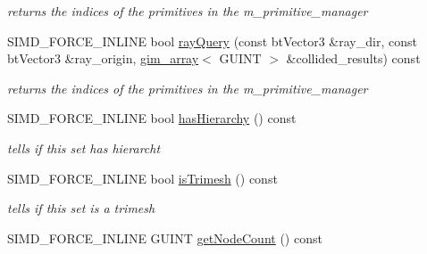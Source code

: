 \begin{Indent}{\bf }
\begin{CompactItemize}
\begin{CompactList}\small\item\em returns the indices of the primitives in the m\_\-primitive\_\-manager \item\end{CompactList}\item 
\hypertarget{class_g_i_m___b_o_x___t_r_e_e___t_e_m_p_l_a_t_e___s_e_t_41bdfb53e019a173fbfb157029db11b4}{
SIMD\_\-FORCE\_\-INLINE bool \hyperlink{class_g_i_m___b_o_x___t_r_e_e___t_e_m_p_l_a_t_e___s_e_t_41bdfb53e019a173fbfb157029db11b4}{rayQuery} (const btVector3 \&ray\_\-dir, const btVector3 \&ray\_\-origin, \hyperlink{classgim__array}{gim\_\-array}$<$ GUINT $>$ \&collided\_\-results) const }
\label{class_g_i_m___b_o_x___t_r_e_e___t_e_m_p_l_a_t_e___s_e_t_41bdfb53e019a173fbfb157029db11b4}

\begin{CompactList}\small\item\em returns the indices of the primitives in the m\_\-primitive\_\-manager \item\end{CompactList}\item 
\hypertarget{class_g_i_m___b_o_x___t_r_e_e___t_e_m_p_l_a_t_e___s_e_t_4582ba1e2cee36d653aae235de9e2562}{
SIMD\_\-FORCE\_\-INLINE bool \hyperlink{class_g_i_m___b_o_x___t_r_e_e___t_e_m_p_l_a_t_e___s_e_t_4582ba1e2cee36d653aae235de9e2562}{hasHierarchy} () const }
\label{class_g_i_m___b_o_x___t_r_e_e___t_e_m_p_l_a_t_e___s_e_t_4582ba1e2cee36d653aae235de9e2562}

\begin{CompactList}\small\item\em tells if this set has hierarcht \item\end{CompactList}\item 
\hypertarget{class_g_i_m___b_o_x___t_r_e_e___t_e_m_p_l_a_t_e___s_e_t_db73fde6e00a979c38b2240b7b706a8d}{
SIMD\_\-FORCE\_\-INLINE bool \hyperlink{class_g_i_m___b_o_x___t_r_e_e___t_e_m_p_l_a_t_e___s_e_t_db73fde6e00a979c38b2240b7b706a8d}{isTrimesh} () const }
\label{class_g_i_m___b_o_x___t_r_e_e___t_e_m_p_l_a_t_e___s_e_t_db73fde6e00a979c38b2240b7b706a8d}

\begin{CompactList}\small\item\em tells if this set is a trimesh \item\end{CompactList}\item 
\hypertarget{class_g_i_m___b_o_x___t_r_e_e___t_e_m_p_l_a_t_e___s_e_t_d46fb05b667c4f79c9d599dfb04d5566}{
SIMD\_\-FORCE\_\-INLINE GUINT \hyperlink{class_g_i_m___b_o_x___t_r_e_e___t_e_m_p_l_a_t_e___s_e_t_d46fb05b667c4f79c9d599dfb04d5566}{getNodeCount} () const }
\label{class_g_i_m___b_o_x___t_r_e_e___t_e_m_p_l_a_t_e___s_e_t_d46fb05b667c4f79c9d599dfb04d5566}


\end{CompactItemize}
\end{Indent}
